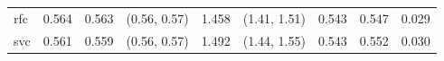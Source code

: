 \begin{table}[H]
\begin{footnotesize}
\begin{tabular}{l|rrrrrrrr}
rfc & {\cellcolor[HTML]{005B25}} \color[HTML]{F1F1F1} 0.564 & {\cellcolor[HTML]{087432}} \color[HTML]{F1F1F1} 0.563 & (0.56, 0.57) & {\cellcolor[HTML]{00682A}} \color[HTML]{F1F1F1} 1.458 & (1.41, 1.51) & {\cellcolor[HTML]{00441B}} \color[HTML]{F1F1F1} 0.543 & {\cellcolor[HTML]{DDF2D8}} \color[HTML]{000000} 0.547 & {\cellcolor[HTML]{005F26}} \color[HTML]{F1F1F1} 0.029 \\
svc & {\cellcolor[HTML]{05712F}} \color[HTML]{F1F1F1} 0.561 & {\cellcolor[HTML]{218944}} \color[HTML]{F1F1F1} 0.559 & (0.56, 0.57) & {\cellcolor[HTML]{00491D}} \color[HTML]{F1F1F1} 1.492 & (1.44, 1.55) & {\cellcolor[HTML]{00441B}} \color[HTML]{F1F1F1} 0.543 & {\cellcolor[HTML]{D7EFD1}} \color[HTML]{000000} 0.552 & {\cellcolor[HTML]{00471C}} \color[HTML]{F1F1F1} 0.030 \\
\bottomrule
\end{tabular}
    \end{footnotesize}
\end{table}
